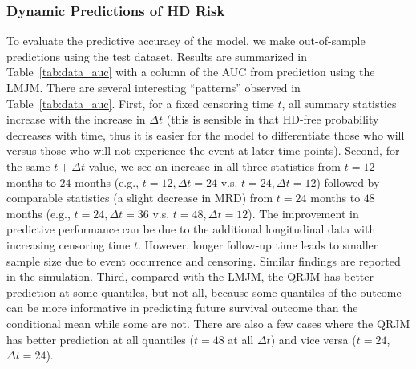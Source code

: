\subsubsection{Dynamic Predictions of HD Risk}\label{sec:data_pred}
To evaluate the predictive accuracy of the model, we make out-of-sample predictions using the test dataset. Results are summarized in Table~\ref{tab:data_auc} with a column of the AUC from prediction using the LMJM. There are several interesting ``patterns'' observed in Table~\ref{tab:data_auc}. First, for a fixed censoring time $t$, all summary statistics increase with the increase in $\Delta t$ (this is sensible in that HD-free probability decreases with time, thus it is easier for the model to differentiate those who will versus those who will not experience the event at later time points). Second, for the same $t+\Delta t$ value, we see an increase in all three statistics from $t=12$ months to $24$ months (e.g., $t=12, \Delta t = 24$ v.s. $t=24, \Delta t=12$) followed by comparable statistics (a slight decrease in MRD) from $t=24$ months to $48$ months (e.g., $t=24, \Delta t= 36$ v.s. $t=48, \Delta t=12$). The improvement in predictive performance can be due to the additional longitudinal data with increasing censoring time $t$. However, longer follow-up time leads to smaller sample size due to event occurrence and censoring. Similar findings are reported in the simulation. Third, compared with the LMJM, the QRJM has better prediction at some quantiles, but not all, because some quantiles of the outcome can be more informative in predicting future survival outcome than the conditional mean while some are not. There are also a few cases where the QRJM has better prediction at all quantiles ($t=48$ at all $\Delta t$) and vice versa ($t=24$, $\Delta t=24$).

